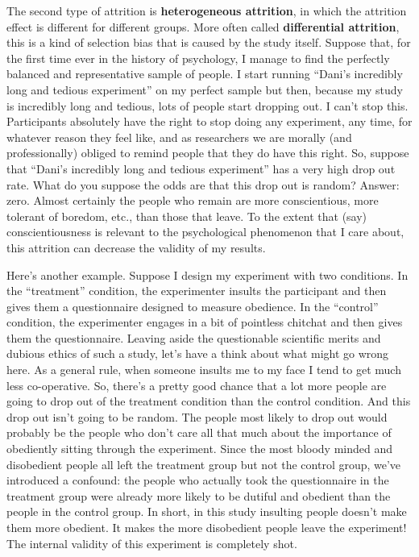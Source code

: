 \documentclass[
]{book}
\begin{document}
The second type of attrition is \textbf{heterogeneous attrition}, in which the attrition effect is different for different groups. More often called \textbf{differential attrition}, this is a kind of selection bias that is caused by the study itself. Suppose that, for the first time ever in the history of psychology, I manage to find the perfectly balanced and representative sample of people. I start running ``Dani's incredibly long and tedious experiment'' on my perfect sample but then, because my study is incredibly long and tedious, lots of people start dropping out. I can't stop this. Participants absolutely have the right to stop doing any experiment, any time, for whatever reason they feel like, and as researchers we are morally (and professionally) obliged to remind people that they do have this right. So, suppose that ``Dani's incredibly long and tedious experiment'' has a very high drop out rate. What do you suppose the odds are that this drop out is random? Answer: zero. Almost certainly the people who remain are more conscientious, more tolerant of boredom, etc., than those that leave. To the extent that (say) conscientiousness is relevant to the psychological phenomenon that I care about, this attrition can decrease the validity of my results.

Here's another example. Suppose I design my experiment with two conditions. In the ``treatment'' condition, the experimenter insults the participant and then gives them a questionnaire designed to measure obedience. In the ``control'' condition, the experimenter engages in a bit of pointless chitchat and then gives them the questionnaire. Leaving aside the questionable scientific merits and dubious ethics of such a study, let's have a think about what might go wrong here. As a general rule, when someone insults me to my face I tend to get much less co-operative. So, there's a pretty good chance that a lot more people are going to drop out of the treatment condition than the control condition. And this drop out isn't going to be random. The people most likely to drop out would probably be the people who don't care all that much about the importance of obediently sitting through the experiment. Since the most bloody minded and disobedient people all left the treatment group but not the control group, we've introduced a confound: the people who actually took the questionnaire in the treatment group were already more likely to be dutiful and obedient than the people in the control group. In short, in this study insulting people doesn't make them more obedient. It makes the more disobedient people leave the experiment! The internal validity of this experiment is completely shot.
\end{document}
